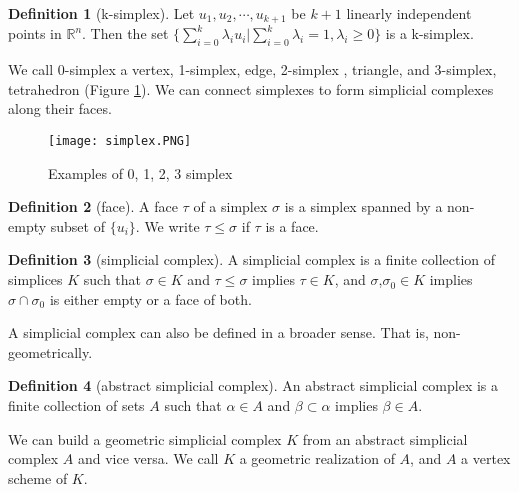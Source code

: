 \documentclass[12pt]{article}
\theoremstyle{definition}
\newtheorem{definition}{Definition}
\newcommand{\RR}{\mathbb{R}}
\begin{document}
\begin{definition}[k-simplex]
Let $u_1, u_2, \cdots, u_{k+1}$ be $k+1$ linearly independent points in $\RR^n$. Then the set $\{\sum^{k}_{i=0}\lambda_{i}u_i|\sum^k_{i=0}\lambda_i=1, \lambda_i\geq 0 \}$ is a k-simplex. 
\end{definition}
We call 0-simplex a vertex, 1-simplex, edge, 2-simplex , triangle, and 3-simplex, tetrahedron (Figure \ref{simplex}). We can connect simplexes to form simplicial complexes along their faces.  
\begin{figure}[h]
\centering
\texttt{[image: simplex.PNG]}
\caption{Examples of 0, 1, 2, 3 simplex\cite{zhu2013language}}
\label{simplex}
\end{figure}
\begin{definition}[face]
A face $\tau$ of a simplex $\sigma$ is a simplex spanned by a non-empty subset of $\{u_i\}$. We write $\tau \leq \sigma$ if $\tau$ is a face.
\end{definition}
\begin{definition}[simplicial complex]
A simplicial complex is a finite collection of simplices $K$ such that $\sigma \in K$ and $\tau \leq \sigma$ implies $\tau \in K$, and $\sigma$,$\sigma_0 \in K$ implies $\sigma \cap \sigma_0$ is either empty or a face of both.
\end{definition}
A simplicial complex can also be defined in a broader sense. That is, non-geometrically. 
\begin{definition}[abstract simplicial complex]
An abstract simplicial complex is a finite collection of sets $A$
such that $\alpha \in A$ and $\beta \subset \alpha$ implies $\beta \in A$.
\end{definition}
We can build a geometric simplicial complex $K$ from an abstract simplicial complex $A$ and vice versa. We call $K$ a geometric realization of $A$, and $A$ a vertex scheme of $K$.
\end{document}

